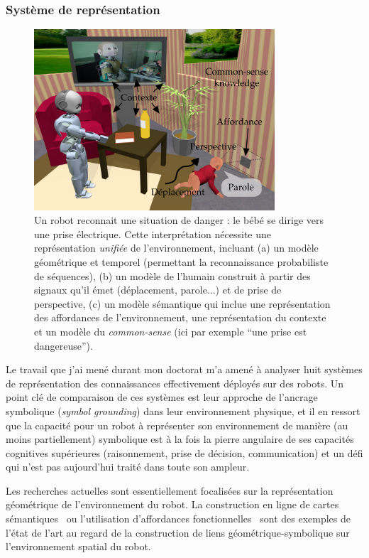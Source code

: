 \documentclass[a4paper]{article}
\begin{document}
\subsubsection*{Système de représentation}

\begin{figure}
    \centering
\includegraphics[width=0.8\textwidth]{figs/signaux}
\caption{\small Un robot reconnait une situation de danger : le bébé se dirige
    vers une prise électrique. Cette interprétation nécessite une représentation
    \emph{unifiée} de l'environnement, incluant (a) un modèle géométrique et
    temporel (permettant la reconnaissance probabiliste de séquences), (b) un
    modèle de l'humain construit à partir des signaux qu'il émet (déplacement,
    parole...) et de prise de perspective, (c) un modèle sémantique qui inclue
    une représentation des affordances de l'environnement, une représentation du
    contexte et un modèle du \emph{common-sense} (ici par exemple ``une prise est
    dangereuse'').  }

\label{babyplug}
\end{figure}

Le travail que j'ai mené durant mon doctorat m'a amené à analyser huit systèmes
de représentation des connaissances effectivement déployés sur des robots. Un
point clé de comparaison de ces systèmes est leur approche de l'ancrage
symbolique (\emph{symbol grounding}) dans leur environnement physique, et il en
ressort que la capacité pour un robot à représenter son environnement de manière
(au moins partiellement) symbolique est à la
fois la pierre angulaire de ses capacités cognitives supérieures (raisonnement,
prise de décision, communication) et un défi qui n'est pas aujourd'hui traité
dans toute son ampleur.

Les recherches actuelles sont essentiellement focalisées sur la représentation
géométrique de l'environnement du robot. La construction en ligne de
cartes sémantiques~\cite{Nuechter2008, Galindo2008,
Blodow2011} ou l'utilisation d'affordances fonctionnelles~\cite{Varadarajan2011}
sont des exemples de l'état de l'art au regard de la construction de liens
géométrique-symbolique sur l'environnement spatial du robot.
\end{document}
